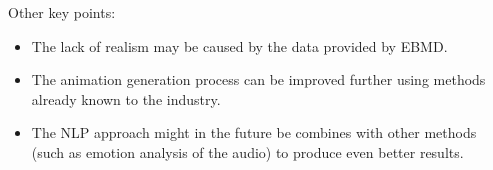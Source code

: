 \noindent Other key points:
\begin{itemize}
	\item The lack of realism may be caused by the data provided by EBMD.
	\item The animation generation process can be improved further using methods already known to the industry.
	\item The NLP approach might in the future be combines with other methods (such as emotion analysis of the audio) to produce even better results.
\end{itemize}




